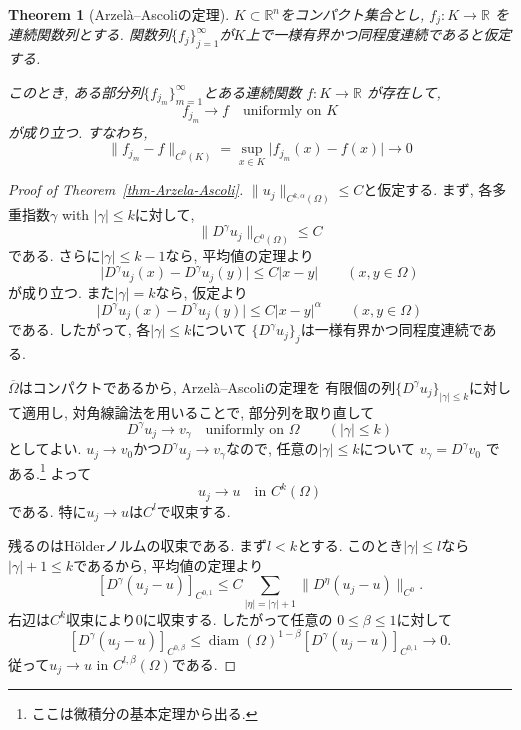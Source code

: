 \documentclass[dvipdfmx,a4paper,11pt]{article} %
\newtheorem{thm}{Theorem}[section]
\theoremstyle{definition}
\theoremstyle{remark}
\numberwithin{equation}{section}
\newcommand{\diam}{\operatorname{diam}}
\begin{document}
\begin{thm}[Arzel\`a--Ascoliの定理]
$K\subset \mathbb{R}^n$をコンパクト集合とし,
\(
  f_j\colon K\to \mathbb{R}
\)
を連続関数列とする. 関数列$\{f_j\}_{j=1}^{\infty}$が$K$上で一様有界かつ同程度連続であると仮定する.

このとき, ある部分列$\{f_{j_m}\}_{m=1}^{\infty}$とある連続関数
\(
  f\colon K\to \mathbb{R}
\)
が存在して,
\[
  f_{j_m}\longrightarrow f
  \quad \text{uniformly on } K
\]
が成り立つ. すなわち,
\[
  \lVert f_{j_m}-f\rVert_{C^0(K)}
  =
  \sup_{x\in K}\lvert f_{j_m}(x)-f(x)\rvert
  \longrightarrow 0
\]
\end{thm}

\begin{proof}[Proof of Theorem~\ref{thm-Arzela-Ascoli}]
$\lVert u_j\rVert_{C^{k,\alpha}(\Omega)}\leq C$と仮定する.
まず, 各多重指数$\gamma$ with $\lvert\gamma\rvert\leq k$に対して,
\[
  \lVert D^\gamma u_j\rVert_{C^0(\Omega)}\leq C
\]
である. さらに$\lvert\gamma\rvert\leq k-1$なら, 平均値の定理より
\[
  \lvert D^\gamma u_j(x)-D^\gamma u_j(y)\rvert
  \leq C\lvert x-y\rvert
  \qquad (x,y\in \Omega)
\]
が成り立つ. また$\lvert\gamma\rvert=k$なら, 仮定より
\[
  \lvert D^\gamma u_j(x)-D^\gamma u_j(y)\rvert
  \leq C\lvert x-y\rvert^\alpha
  \qquad (x,y\in \Omega)
\]
である. したがって, 各$\lvert\gamma\rvert\leq k$について
$\{D^\gamma u_j\}_j$は一様有界かつ同程度連続である.

$\overline{\Omega}$はコンパクトであるから, Arzel\`a--Ascoliの定理を
有限個の列$\{D^\gamma u_j\}_{\lvert\gamma\rvert\leq k}$に対して適用し,
対角線論法を用いることで, 部分列を取り直して
\[
  D^\gamma u_j \longrightarrow v_\gamma
  \quad \text{uniformly on } \Omega
  \qquad (\lvert\gamma\rvert\leq k)
\]
としてよい. 
$u_j \to v_0$かつ$D^\gamma u_j \to v_\gamma$なので, 
任意の$\lvert\gamma\rvert\leq k$について
\(
  v_\gamma=D^\gamma v_0
\)
である.\footnote{ここは微積分の基本定理から出る.} 
よって
\[
  u_j\longrightarrow u
  \quad \text{in } C^k(\Omega)
\]
である. 特に$u_j\to u$は$C^l$で収束する.

残るのはH\"olderノルムの収束である. まず$l<k$とする.
このとき$\lvert\gamma\rvert\leq l$なら$\lvert\gamma\rvert+1\leq k$であるから,
平均値の定理より
\[
  [D^\gamma(u_j-u)]_{C^{0,1}}
  \leq
  C\sum_{\lvert\eta\rvert=\lvert\gamma\rvert+1}
  \lVert D^\eta(u_j-u)\rVert_{C^0}.
\]
右辺は$C^k$収束により$0$に収束する. したがって任意の
$0\leq \beta\leq 1$に対して
\[
  [D^\gamma(u_j-u)]_{C^{0,\beta}}
  \leq
  \diam(\Omega)^{1-\beta}
  [D^\gamma(u_j-u)]_{C^{0,1}}
  \longrightarrow 0.
\]
従って$u_j\to u$ in $C^{l,\beta}(\Omega)$である.


\end{proof}
\end{document}
